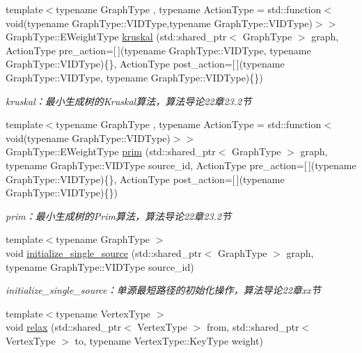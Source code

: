 \begin{DoxyCompactItemize}
{\footnotesize template$<$typename Graph\+Type , typename Action\+Type  = std\+::function$<$ void(typename Graph\+Type\+::\+V\+I\+D\+Type,typename Graph\+Type\+::\+V\+I\+D\+Type)$>$$>$ }\\Graph\+Type\+::\+E\+Weight\+Type \hyperlink{namespace_introduction_to_algorithm_1_1_graph_algorithm_a2575c09c42d0b30b57702c9379d2fbfb}{kruskal} (std\+::shared\+\_\+ptr$<$ Graph\+Type $>$ graph, Action\+Type pre\+\_\+action=\mbox{[}$\,$\mbox{]}(typename Graph\+Type\+::\+V\+I\+D\+Type, typename Graph\+Type\+::\+V\+I\+D\+Type)\{\}, Action\+Type post\+\_\+action=\mbox{[}$\,$\mbox{]}(typename Graph\+Type\+::\+V\+I\+D\+Type, typename Graph\+Type\+::\+V\+I\+D\+Type)\{\})
\begin{DoxyCompactList}\small\item\em kruskal：最小生成树的\+Kruskal算法，算法导论22章23.2节 \end{DoxyCompactList}\item 
{\footnotesize template$<$typename Graph\+Type , typename Action\+Type  = std\+::function$<$ void(typename Graph\+Type\+::\+V\+I\+D\+Type)$>$$>$ }\\Graph\+Type\+::\+E\+Weight\+Type \hyperlink{namespace_introduction_to_algorithm_1_1_graph_algorithm_aba1581358d79ba82dc4fd0c15bc987e6}{prim} (std\+::shared\+\_\+ptr$<$ Graph\+Type $>$ graph, typename Graph\+Type\+::\+V\+I\+D\+Type source\+\_\+id, Action\+Type pre\+\_\+action=\mbox{[}$\,$\mbox{]}(typename Graph\+Type\+::\+V\+I\+D\+Type)\{\}, Action\+Type post\+\_\+action=\mbox{[}$\,$\mbox{]}(typename Graph\+Type\+::\+V\+I\+D\+Type)\{\})
\begin{DoxyCompactList}\small\item\em prim：最小生成树的\+Prim算法，算法导论22章23.2节 \end{DoxyCompactList}\item 
{\footnotesize template$<$typename Graph\+Type $>$ }\\void \hyperlink{namespace_introduction_to_algorithm_1_1_graph_algorithm_a5ed496e8825564d0f9fcfe3b0ac41dec}{initialize\+\_\+single\+\_\+source} (std\+::shared\+\_\+ptr$<$ Graph\+Type $>$ graph, typename Graph\+Type\+::\+V\+I\+D\+Type source\+\_\+id)
\begin{DoxyCompactList}\small\item\em initialize\+\_\+single\+\_\+source：单源最短路径的初始化操作，算法导论22章xx节 \end{DoxyCompactList}\item 
{\footnotesize template$<$typename Vertex\+Type $>$ }\\void \hyperlink{namespace_introduction_to_algorithm_1_1_graph_algorithm_afe2bd83fca7df7e07ece9a59b8e7f5a6}{relax} (std\+::shared\+\_\+ptr$<$ Vertex\+Type $>$ from, std\+::shared\+\_\+ptr$<$ Vertex\+Type $>$ to, typename Vertex\+Type\+::\+Key\+Type weight)

\end{DoxyCompactItemize}
